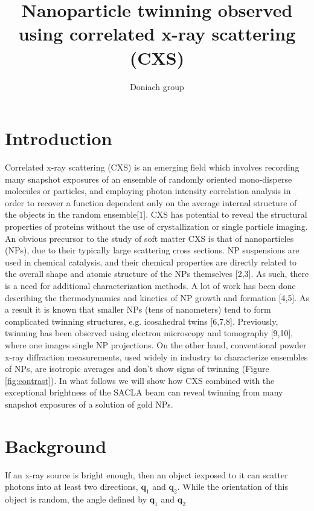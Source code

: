 \documentclass [11pt,fleqn]{article}
\title{Nanoparticle twinning observed using  correlated x-ray scattering (CXS)}
\author{Doniach group}
\date{}
\begin{document}
 
\maketitle

\delimitershortfall=-1pt




\section{Introduction}

Correlated x-ray scattering (CXS) is an emerging field which involves recording many snapshot exposures of an ensemble of randomly oriented mono-disperse molecules or particles, and employing photon intensity correlation analysis in order to recover a function dependent only on the average internal structure of the objects in the random ensemble[1]. CXS has potential to reveal the structural properties of proteins without the use of crystallization or single particle imaging. An obvious precursor to the study of soft matter CXS is that of nanoparticles (NPs), due to their typically large scattering cross sections. NP suspensions are used in chemical catalysis, and their chemical properties are directly related to  the overall shape and atomic structure of the NPs themselves [2,3]. As such, there is a need for additional characterization methods. A lot of work has been done describing the thermodynamics and kinetics of NP growth and formation [4,5]. As a result it is known that smaller NPs (tens of nanometers) tend to form complicated twinning structures, e.g. icosahedral twins [6,7,8]. Previously, twinning has been observed using electron microscopy and tomography [9,10], where one images single NP projections. On the other hand, conventional powder x-ray diffraction measurements, used widely in industry to characterize ensembles of NPs, are isotropic averages and don't show signs of twinning (Figure \ref{fig:contrast}). In what follows we will show how CXS combined with the exceptional brightness of the SACLA beam can reveal twinning from many snapshot exposures of a solution of gold NPs.

\section{Background}
If an x-ray source is bright enough, then an object iexposed to it can scatter photons into at least two directions, $\bm q_1$ and $\bm q_2$. While the orientation of this object is random, the angle defined by $\bm q_1$ and $\bm q_2$ 
\end{document}
